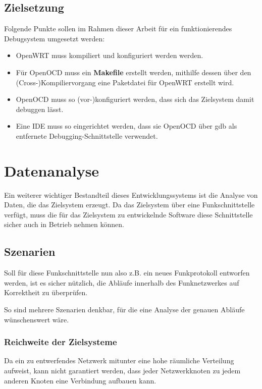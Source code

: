 \subsection{Zielsetzung}
\begin{minipage}[c]{\textwidth}
Folgende Punkte sollen im Rahmen dieser Arbeit für ein funktionierendes
Debugsystem umgesetzt werden:
\begin{itemize}
  \item OpenWRT muss kompiliert und konfiguriert werden werden.
  \item Für OpenOCD muss ein \textbf{Makefile} erstellt werden, mithilfe
  dessen über den \linebreak(Cross-)Kompiliervorgang eine Paketdatei für
  OpenWRT erstellt wird.
  \item OpenOCD muss so (vor-)konfiguriert werden, dass sich das Zielsystem
  damit debuggen lässt.
  \item Eine IDE muss so eingerichtet werden, dass sie OpenOCD über \gls{gdb}
  als entfernete Debugging-Schnittstelle verwendet.
\end{itemize}
\end{minipage}
\section{Datenanalyse}\label{sec:datenan}
Ein weiterer wichtiger Bestandteil dieses Entwicklungssystems ist die Analyse
von Daten, die das Zielsystem erzeugt. Da das Zielsystem über eine
Funkschnittstelle verfügt, muss die für das Zielsystem zu entwickelnde
Software diese Schnittstelle sicher auch in Betrieb nehmen können.
\subsection{Szenarien}
Soll für diese Funkschnittstelle nun also z.B. ein neues Funkprotokoll entworfen
werden, ist es sicher nützlich, die Abläufe innerhalb des Funknetzwerkes auf
Korrektheit zu überprüfen.

So sind mehrere Szenarien denkbar, für die eine Analyse der genauen Abläufe
wünschenswert wäre.

\subsubsection*{Reichweite der Zielsysteme}
Da ein zu entwerfendes Netzwerk mitunter eine hohe räumliche Verteilung
aufweist, kann nicht garantiert werden, dass jeder Netzwerkknoten zu jedem
anderen Knoten eine Verbindung aufbauen kann.

